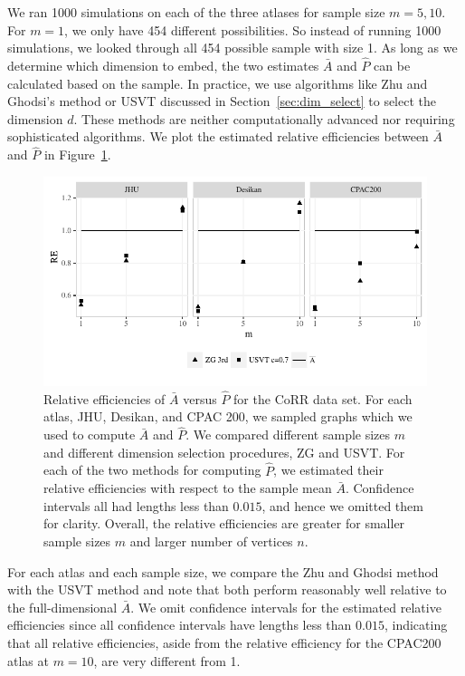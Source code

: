 We ran 1000 simulations on each of the three atlases for sample size $m=5, 10$. For $m=1$, we only have 454 different possibilities. So instead of running 1000 simulations, we looked through all 454 possible sample with size 1. As long as we determine which dimension to embed, the two estimates $\bar{A}$ and $\hat{P}$ can be calculated based on the sample.
In practice, we use algorithms like Zhu and Ghodsi's method or USVT discussed in Section~\ref{sec:dim_select} to select the dimension $d$. These methods are neither computationally advanced nor requiring sophisticated algorithms.
We plot the estimated relative efficiencies between $\bar{A}$ and $\hat{P}$ in Figure~\ref{fig:corr_re}.

\begin{figure}
\begin{center}
\includegraphics[width=1\linewidth]{./Figures/corr_data_REdiff.pdf}
\end{center}
\caption[Relative efficiencies of two estimators for the CoRR data set]{Relative efficiencies of $\bar{A}$ versus $\hat{P}$ for the CoRR data set.
For each atlas, JHU, Desikan, and CPAC 200, we sampled graphs which we used to compute $\bar{A}$ and $\hat{P}$.
We compared different sample sizes $m$ and different dimension selection procedures, ZG and USVT.
For each of the two methods for computing $\hat{P}$, we estimated their relative efficiencies with respect to the sample mean $\bar{A}$.
Confidence intervals all had lengths less than $0.015$, and hence we omitted them for clarity.
Overall, the relative efficiencies are greater for smaller sample sizes $m$ and larger number of vertices $n$.} 
\label{fig:corr_re}
\end{figure}

For each atlas and each sample size, we compare the Zhu and Ghodsi method \citep{zhu2006automatic} with the USVT method \citep{chatterjee2015matrix} and note that both perform reasonably well relative to the full-dimensional $\bar{A}$.
We omit confidence intervals for the estimated relative efficiencies since all confidence intervals have lengths less than $0.015$, indicating that all relative efficiencies, aside from the relative efficiency for the CPAC200 atlas at $m=10$, are very different from 1.

